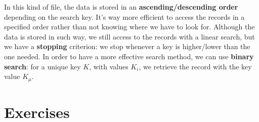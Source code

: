 In this kind of file, the data is stored in an \textbf{ascending/descending order} depending on the search key. It's way more efficient to access the records in a specified order rather than not knowing where we have to look for. Although the data is stored in such way, we still access to the records with a linear search, but we have a \textbf{stopping} criterion: we stop whenever a key is higher/lower than the one needed. In order to have a more effective search method, we can use \textbf{binary search}: for a unique key $K$, with values $K_i$, we retrieve the record with the key value $K_\mu$.


\section{Exercises}

